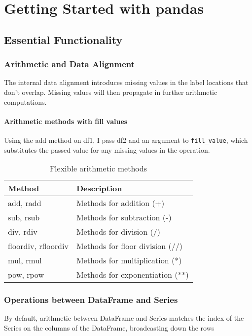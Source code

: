 \chapter{Getting Started with pandas\label{Ch05}}
\section{Essential Functionality}
\subsection*{Arithmetic and Data Alignment}
The internal data alignment introduces missing values in the label locations that don't overlap. Missing values will then propagate in further arithmetic computations.
\subsubsection*{Arithmetic methods with fill values}
Using the add method on df1, I pass df2 and an argument to \verb|fill_value|, which substitutes the passed value for any missing values in the operation.

\begin{table}
    \centering
    \caption{Flexible arithmetic methods}
    \begin{tabularx}{.6\textwidth}{ll}
        \hline
        Method              & Description                     \\
        \hline
        add, radd           & Methods for addition (+)        \\
        sub, rsub           & Methods for subtraction (-)     \\
        div, rdiv           & Methods for division (/)        \\
        floordiv, rfloordiv & Methods for floor division (//) \\
        mul, rmul           & Methods for multiplication (*)  \\
        pow, rpow           & Methods for exponentiation (**) \\
        \hline
    \end{tabularx}
\end{table}

\subsection*{Operations between DataFrame and Series}
By default, arithmetic between DataFrame and Series matches the index of the Series on the columns of the DataFrame, broadcasting down the rows

